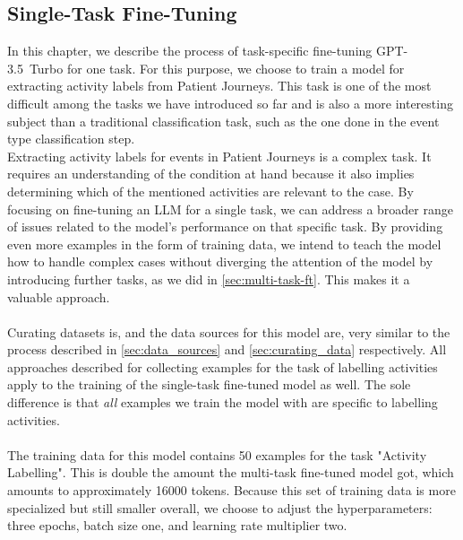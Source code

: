 \subsection{Single-Task Fine-Tuning}\label{sec:single-task-ft}
In this chapter, we describe the process of task-specific fine-tuning GPT-3.5~Turbo for one task. For this purpose, we choose to train a model for extracting activity labels from Patient Journeys. This task is one of the most difficult among the tasks we have introduced so far and is also a more interesting subject than a traditional classification task, such as the one done in the event type classification step.\\
Extracting activity labels for events in Patient Journeys is a complex task. It requires an understanding of the condition at hand because it also implies determining which of the mentioned activities are relevant to the case. By focusing on fine-tuning an LLM for a single task, we can address a broader range of issues related to the model's performance on that specific task. By providing even more examples in the form of training data, we intend to teach the model how to handle complex cases without diverging the attention of the model by introducing further tasks, as we did in \autoref{sec:multi-task-ft}. This makes it a valuable approach.\\\\
Curating datasets is, and the data sources for this model are, very similar to the process described in \autoref{sec:data_sources} and \autoref{sec:curating_data} respectively. All approaches described for collecting examples for the task of labelling activities apply to the training of the single-task fine-tuned model as well. The sole difference is that \emph{all} examples we train the model with are specific to labelling activities.\\\\
The training data for this model contains 50 examples for the task "Activity Labelling". This is double the amount the multi-task fine-tuned model got, which amounts to approximately 16000 tokens. Because this set of training data is more specialized but still smaller overall, we choose to adjust the hyperparameters: three epochs, batch size one, and learning rate multiplier two.

